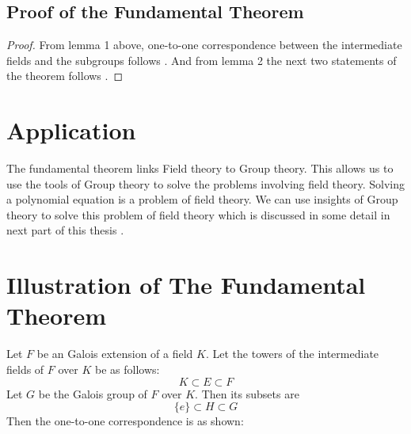 \subsection{Proof of the Fundamental Theorem}
\begin{proof}
From lemma 1 above, one-to-one correspondence between the intermediate fields and the subgroups follows \cite{hunger}. And from lemma 2 the next two statements of the theorem follows \cite{hunger}.
\end{proof}
\vspace{3mm}

\section{Application}
The fundamental theorem links Field theory to Group theory. This allows us to use the tools of Group theory to solve the problems involving field theory. Solving a polynomial equation is a problem of field theory. We can use insights of Group theory to solve this problem of field theory which is discussed in some detail in next part of this thesis \cite{hunger}.
\clearpage

\section{Illustration of The Fundamental Theorem}
\begin{minipage}{0.68\textwidth}
  Let \(F\) be an Galois extension of a field \(K\). Let the towers of the intermediate fields of \(F\) over \(K\) be as follows:
  \[
    K \subset E \subset F
  \]
\noindent
  Let \(G\) be the Galois group of \(F\) over \(K\). Then its subsets are
  \[
    \{e\} \subset H \subset G
  \]
  Then the one-to-one correspondence is as shown:
\end{minipage}\hspace{2mm}
\begin{minipage}{0.3\textwidth}

  \begin{tcolorbox}[colback=gray!20, colframe=blue!20, title={\footnotesize \textcolor{black}{Galois-correspondence}}, width=5cm]
  \end{tcolorbox}
\end{minipage}

